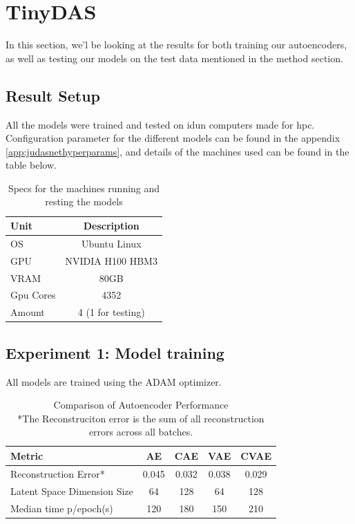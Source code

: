 \section{TinyDAS}
\label{res:tinydas}

In this section, we'l be looking at the results for both training our autoencoders, as well as testing our models on the test data mentioned in the method section.

\subsection{Result Setup}

All the models were trained and tested on \gls{idun} computers made for \acrshort{hpc}. Configuration parameter for the different models can be found in the appendix \ref{app:judasnethyperparams}, and details of the machines used can be found in the table below. \\



\begin{table}[!h]
\centering
\begin{tabular}{|l|c|}
\hline
\textbf{Unit} & \textbf{Description}         \\ \hline
OS            & Ubuntu Linux          \\ \hline
GPU           & NVIDIA H100 HBM3     \\ \hline
VRAM          & 80GB                  \\ \hline
Gpu Cores     & 4352                  \\ \hline
Amount        & 4 (1 for testing)     \\ \hline
\end{tabular}
\label{tab:specs}
\caption{Specs for the machines running and resting the models}
\end{table}





\subsection{Experiment 1: Model training}

All models are trained using the ADAM optimizer.

\begin{table}[!htbp]
    \centering
    \begin{tabular}{lcccc}
        \hline
        \textbf{Metric} & \textbf{AE} & \textbf{CAE} & \textbf{VAE} & \textbf{CVAE} \\
        \hline
        Reconstruction Error* & 0.045 & 0.032 & 0.038 & 0.029 \\
        Latent Space Dimension Size & 64 & 128 & 64 & 128 \\
        Median time p/epoch(s) & 120 & 180 & 150 & 210 \\
        \hline
    \end{tabular}
    \caption{Comparison of Autoencoder Performance\\ *The Reconstruciton error is the sum of all reconstruction errors across all batches.}
    \label{tab:autoencoder_comparison}
\end{table}

